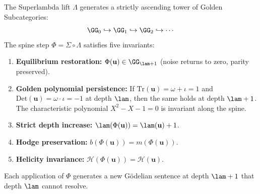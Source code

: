 \begin{theorem}\label{thm:spiral}
The Superlambda lift $\Lambda$ generates a strictly ascending tower of Golden Subcategories:
$$\GG_0 \hookrightarrow \GG_1 \hookrightarrow \GG_2 \hookrightarrow \cdots$$
The spine step $\Phi = \Sigma \circ \Lambda$ satisfies five invariants:
\begin{enumerate}
\item \textbf{Equilibrium restoration:} $\Phi(\mathbf{u}) \in \GG_{\lam+1}$ (noise returns to zero, parity preserved).
\item \textbf{Golden polynomial persistence:} If $\mathrm{Tr}(\mathbf{u}) = \omega + \iota = 1$ and $\mathrm{Det}(\mathbf{u}) = \omega \cdot \iota = -1$ at depth $\lam$, then the same holds at depth $\lam + 1$. The characteristic polynomial $X^2 - X - 1 = 0$ is invariant along the spine.
\item \textbf{Strict depth increase:} $\lam(\Phi(\mathbf{u})) = \lam(\mathbf{u}) + 1$.
\item \textbf{Hodge preservation:} $b(\Phi(\mathbf{u})) = m(\Phi(\mathbf{u}))$.
\item \textbf{Helicity invariance:} $\mathcal{H}(\Phi(\mathbf{u})) = \mathcal{H}(\mathbf{u})$.
\end{enumerate}
Each application of $\Phi$ generates a new G\"odelian sentence at depth $\lam + 1$ that depth $\lam$ cannot resolve.
\end{theorem}

